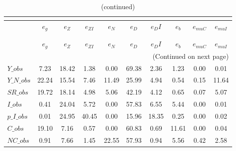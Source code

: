  
\begin{center}
\begin{longtable}{lccccccccc} 
\caption{VARIANCE DECOMPOSITION (in percent)}\\
 \label{Table:th_var_decomp_uncond}\\
\toprule 
$               $	 & 	 $        {e_g}$	 & 	 $        {e_Z}$	 & 	 $     {e_{ZI}}$	 & 	 $        {e_N}$	 & 	 $        {e_D}$	 & 	 $       {e_DI}$	 & 	 $        {e_b}$	 & 	 $    {e_{muC}}$	 & 	 $    {e_{muI}}$\\
\midrule \endfirsthead 
\caption{(continued)}\\
 \toprule \\ 
$               $	 & 	 $        {e_g}$	 & 	 $        {e_Z}$	 & 	 $     {e_{ZI}}$	 & 	 $        {e_N}$	 & 	 $        {e_D}$	 & 	 $       {e_DI}$	 & 	 $        {e_b}$	 & 	 $    {e_{muC}}$	 & 	 $    {e_{muI}}$\\
\midrule \endhead 
\midrule \multicolumn{10}{r}{(Continued on next page)} \\ \bottomrule \endfoot 
\bottomrule \endlastfoot 
$Y\_obs         $	 & 	         7.23	 & 	        18.42	 & 	         1.38	 & 	         0.00	 & 	        69.38	 & 	         2.36	 & 	         1.23	 & 	         0.00	 & 	         0.01 \\ 
$Y\_N\_obs      $	 & 	        22.24	 & 	        15.54	 & 	         7.46	 & 	        11.49	 & 	        25.99	 & 	         4.94	 & 	         0.54	 & 	         0.15	 & 	        11.64 \\ 
$SR\_obs        $	 & 	        19.72	 & 	        18.14	 & 	         4.98	 & 	         5.06	 & 	        42.19	 & 	         4.12	 & 	         0.65	 & 	         0.07	 & 	         5.07 \\ 
$I\_obs         $	 & 	         0.41	 & 	        24.04	 & 	         5.72	 & 	         0.00	 & 	        57.83	 & 	         6.55	 & 	         5.44	 & 	         0.00	 & 	         0.01 \\ 
$p\_I\_obs      $	 & 	         0.01	 & 	        24.95	 & 	        40.45	 & 	         0.00	 & 	        15.96	 & 	        18.35	 & 	         0.25	 & 	         0.00	 & 	         0.02 \\ 
$C\_obs         $	 & 	        19.10	 & 	         7.16	 & 	         0.57	 & 	         0.00	 & 	        60.83	 & 	         0.69	 & 	        11.61	 & 	         0.00	 & 	         0.04 \\ 
$NC\_obs        $	 & 	         0.91	 & 	         7.66	 & 	         1.45	 & 	        22.55	 & 	        57.93	 & 	         0.94	 & 	         5.56	 & 	         0.42	 & 	         2.58 \\ 

\end{longtable}
\end{center}
